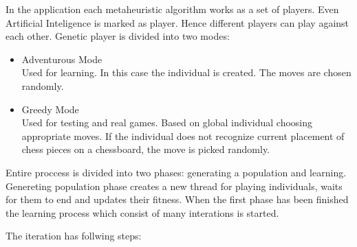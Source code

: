 \documentclass[pdftex]{article}
\begin{document}
In the application each metaheuristic algorithm works as a set of players. Even Artificial Inteligence is marked as player. Hence different players can play against each other. Genetic player is divided into two modes:
\begin{itemize}
 	\item Adventurous Mode \hfill \\
		Used for learning. In this case the individual is created. The moves are chosen randomly.

	\item Greedy Mode \hfill \\
		Used for testing and real games. Based on global individual choosing appropriate moves. If the individual does not recognize current placement of chess pieces on a chessboard, the move is picked randomly.
\end{itemize}

Entire proccess is divided into two phases: generating a population and learning.
Genereting population phase creates a new thread for playing individuals, waits for them to end and updates their fitness.
When the first phase has been finished the learning process which consist of many interations is started.

The iteration has follwing steps:
\end{document}
